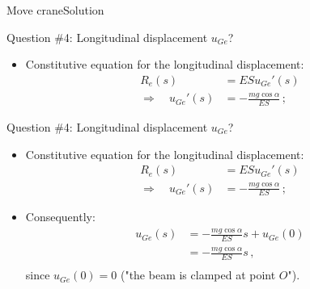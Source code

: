 \documentclass{beamer}
\newcommand{\imply}{\Rightarrow}
\newcommand{\uj}{u}
\newcommand{\Fresj}{R}
\begin{document}
%
%
%

\begin{frame}{Move crane}{Solution}

\begin{overprint}

\vskip-20pt
\begin{exampleblock}{Question \#4: Longitudinal displacement $\uj_{Ge}$?}
\begin{itemize}
\item Constitutive equation for the longitudinal displacement:
\begin{displaymath}
\begin{split}
\Fresj_e(s) &=ES\uj_{Ge}'(s) \\
\imply\quad\uj_{Ge}'(s) &=-\frac{mg\cos\alpha}{ES}\,;
\end{split}
\end{displaymath}
\end{itemize}
\end{exampleblock}

\vskip-20pt
\begin{exampleblock}{Question \#4: Longitudinal displacement $\uj_{Ge}$?}
\begin{itemize}
\item Constitutive equation for the longitudinal displacement:
\begin{displaymath}
\begin{split}
\Fresj_e(s) &=ES\uj_{Ge}'(s) \\
\imply\quad\uj_{Ge}'(s) &=-\frac{mg\cos\alpha}{ES}\,;
\end{split}
\end{displaymath}
\item Consequently:
\begin{displaymath}
\begin{split}
\uj_{Ge}(s) &=-\frac{mg\cos\alpha}{ES}s+\uj_{Ge}(0) \\
&=-\frac{mg\cos\alpha}{ES}s\,, \\
\end{split}
\end{displaymath}
since $\uj_{Ge}(0)=0$ ("the beam is clamped at point $O$").
\end{itemize}
\end{exampleblock}

\end{overprint}

\end{frame}
\end{document}
